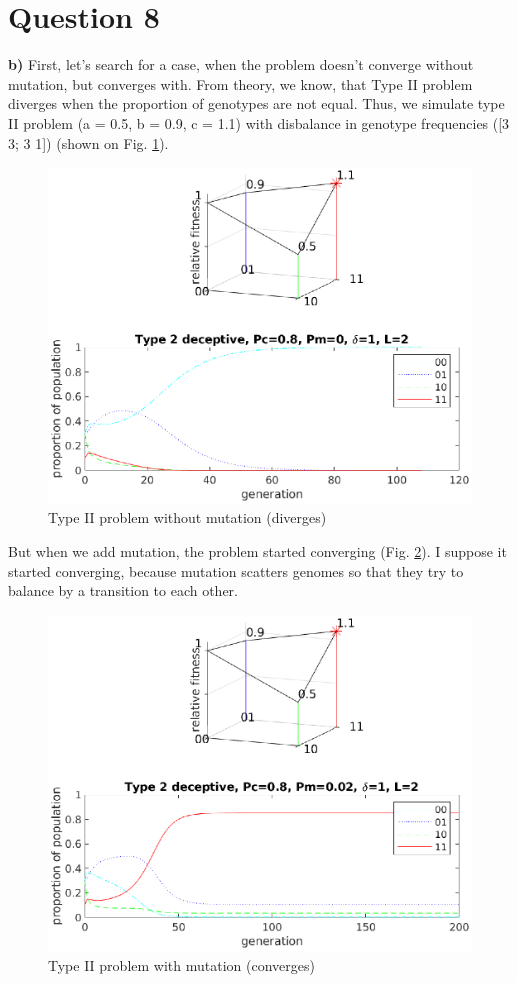 \documentclass[12pt, a4paper]{article}
\begin{document}
    \section{Question 8}
    {\bf b)} First, let's search for a case, when the problem doesn't converge
    without mutation, but converges with. From theory, we know, that Type II
    problem diverges when the proportion of genotypes are not equal. Thus, we
    simulate type II problem (a = 0.5, b = 0.9, c = 1.1) with disbalance in
    genotype frequencies ([3 3; 3 1]) (shown on Fig. \ref{fig:t2_no_mut}).
    \begin{figure}[H]
    \centering
        \includegraphics[width=0.8\linewidth]{pics/type2_fail.eps}
        \caption{Type II problem without mutation (diverges)}
        \label{fig:t2_no_mut}
    \end{figure}

    But when we add mutation, the problem started converging (Fig. \ref{fig:t2_w_mut}).
    I suppose it started converging, because mutation scatters genomes so that they try
    to balance by a transition to each other.
    \begin{figure}[H]
    \centering
        \includegraphics[width=0.8\linewidth]{pics/type2_ok.eps}
        \caption{Type II problem with mutation (converges)}
        \label{fig:t2_w_mut}
    \end{figure}
\end{document}
